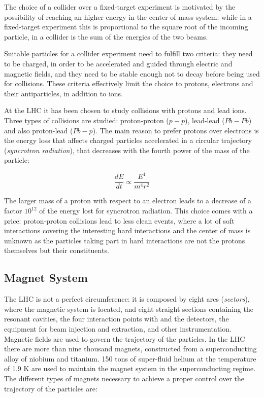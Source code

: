 The choice of a collider over a fixed-target experiment is motivated by the possibility of reaching an higher energy in the center of mass system: while in a fixed-target experiment this is proportional to the square root of the incoming particle, in a collider is the sum of the energies of the two beams.


Suitable particles for a collider experiment need to fulfill two criteria: they need to be charged, in order to be accelerated and guided through electric and magnetic fields, and they need to be stable enough not to decay before being used for collisions. These criteria effectively limit the choice to protons, electrons and their antiparticles, in addition to ions. 

At the LHC it has been chosen to study collisions with protons and lead ions. Three types of collisions are studied: proton-proton ($p-p$), lead-lead ($Pb-Pb$) and also proton-lead ($Pb-p$). The main reason to prefer protons over electrons is the energy loss that affects charged particles accelerated in a circular trajectory (\textit{syncrotron radiation}), that decreases with the fourth power of the mass of the particle:

\begin{equation}
\label{eq:cern:sync}
\frac{dE}{dt} \propto \frac{E^4}{m^4 r^2}
\end{equation}

The larger mass of a proton with respect to an electron leads to a decrease of a factor $10^{12}$ of the energy lost for syncrotron radiation. This choice comes with a price: proton-proton collisions lead to less clean events, where a lot of soft interactions covering the interesting hard interactions and the center of mass is unknown as the particles taking part in hard interactions are not the protons themselves but their constituents.

\subsection{Magnet System} 


The LHC is not a perfect circumference: it is composed by eight arcs (\textit{sectors}), where the magnetic system is located, and eight straight sections containing the resonant cavities, the four interaction points with and the detectors, the equipment for beam injection and extraction, and other instrumentation. Magnetic fields are used to govern the trajectory of the particles. In the LHC there are more than nine thousand magnets, constructed from a superconducting alloy of niobium and titanium. 150 tons of super-fluid helium at the temperature of 1.9 K are used to maintain the magnet system in the superconducting regime. The different types of magnets necessary to achieve a proper control over the trajectory of the particles are:


